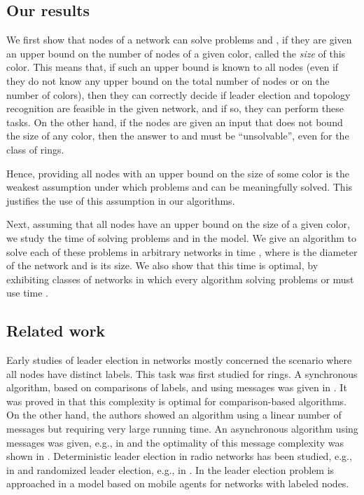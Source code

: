 \documentclass[a4paper,10pt]{article}
\begin{document}
\subsection{Our results} \label{subsec:our_results}


We first show that nodes of a network can solve problems  and , if they are given
an upper bound  on the number of nodes of a given color, called the {\em size} of this color.
This means that, if such an upper bound is known to all nodes (even if they do not know any upper bound on the total number of nodes
or on the number of colors), then they can correctly decide if leader election and topology recognition
are feasible in the given network, and if so, they can perform these tasks. 
On the other hand, if the nodes are given an input that does not bound the size of any color, then the answer to  and  must be ``unsolvable'', even for the class of rings.

Hence, providing all nodes with an upper bound on the size of some color is the weakest assumption under which problems  and  can be meaningfully solved. 
This justifies the use of this assumption in our algorithms.


Next, assuming that all nodes have an upper bound  on the size of a given color,
we study the time of solving problems  and  in the  model. We give an 
algorithm to solve each of these problems in arbitrary networks in time , where  is the diameter
of the network and  is its size. We also show that this time is optimal, by exhibiting
classes of networks in which every algorithm solving problems  or  must use time
.



\subsection{Related work} \label{subsec:related_work}
Early studies of leader election in networks mostly concerned the scenario where all nodes have distinct labels.
This task was first studied for rings.
A synchronous algorithm, based on comparisons of labels, and using
 messages was given in \cite{HS}. It was proved in \cite{FL} that
this complexity is optimal for comparison-based algorithms. On the other hand, the authors showed
an algorithm using a linear number of messages but requiring very large running time.
An asynchronous algorithm using  messages was given, e.g., in \cite{P} and
the optimality of this message complexity was shown in \cite{B}. Deterministic leader election in radio networks has been studied, e.g., 
in \cite{JKZ,KP,NO} and randomized leader election, e.g., in \cite{Wil}. In \cite{HKMMJ} the leader election problem is
approached in a model based on mobile agents for networks with labeled nodes.
\end{document}
